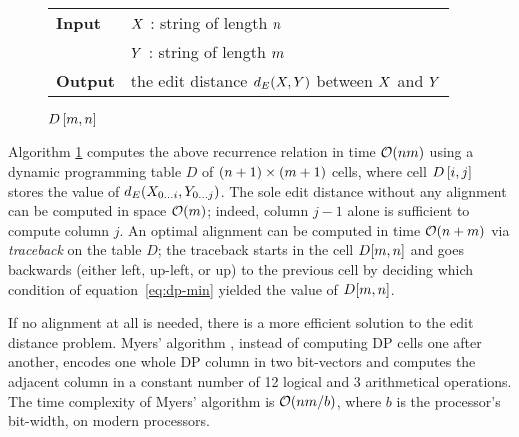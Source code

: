 \begin{figure*}[t]
\begin{center}
\begin{minipage}[t]{.9\textwidth}
\begin{algorithm}[H]
\begin{tabular}{ll}
\textbf{Input}  & $X$ : string of length $n$\\
				& $Y$ : string of length $m$\\
\textbf{Output} & the edit distance $d_E(X,Y)$ between $X$ and $Y$\\
\end{tabular}
\begin{algorithmic}[1]
\EndFor
{}
	\EndFor
\EndFor
\State \Return $D\left[m,n\right]$
\end{algorithmic}
\label{alg:dp-edit}
\end{algorithm}
\end{minipage}
\end{center}
\end{figure*}

Algorithm \ref{alg:dp-edit} computes the above recurrence relation in time $\mathcal{O}(nm)$ using a dynamic programming table $D$ of $(n+1) \times (m+1)$ cells, where cell $D\left[i,j\right]$ stores the value of $d_E({X}_{{0}\dots{i}},{Y}_{{0}\dots{j}})$.
The sole edit distance without any alignment can be computed in space $\mathcal{O}(m)$; indeed, column $j-1$ alone is sufficient to compute column $j$.
An optimal alignment can be computed in time $\mathcal{O}(n + m)$ via \emph{traceback} on the table $D$;
the traceback starts in the cell $D[m,n]$ and goes backwards (either left, up-left, or up) to the previous cell by deciding which condition of equation~\ref{eq:dp-min} yielded the value of $D[m,n]$.

If no alignment at all is needed, there is a more efficient solution to the edit distance problem.
Myers' algorithm \citep{Myers1999}, instead of computing DP cells one after another, encodes one whole DP column in two bit-vectors and computes the adjacent column in a constant number of 12 logical and 3 arithmetical operations.
The time complexity of Myers' algorithm is $\mathcal{O}(nm/b)$, where $b$ is the processor's bit-width,  on modern processors.

